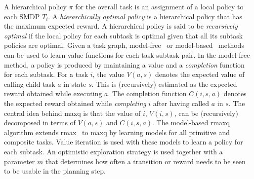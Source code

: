   A hierarchical policy $\pi$ for the
overall task is an assignment of a local policy to each SMDP $T_i$.  A
\textit{hierarchically optimal policy} is a 
hierarchical policy that has the maximum expected reward.  A
hierarchical policy is said to be \textit{recursively optimal} if the
local policy for each subtask is optimal given that all its subtask
policies are optimal.  
Given a task graph,
model-free~\cite{d-hrl-00} or model-based~\cite{rmax-maxq} methods can
be used to learn value functions for each task-subtask pair.
In the model-free method, a policy is produced by maintaining a value
and a {\em completion} function for each subtask. For a task $i$, the
value $V(a,s)$ denotes the expected value of calling child task $a$ in
state $s$. This is (recursively) estimated as the expected reward
obtained while executing $a$. The completion function $C(i,s,a)$
denotes the expected reward obtained while {\em completing} $i$ after
having called $a$ in $s$. The central idea behind {\sc maxq} is that
the value of $i$, $V(i,s)$, can be (recursively) decomposed in terms
of $V(a,s)$ and $C(i,s,a)$. The model-based {\sc
rmaxq}~\cite{rmax-maxq} algorithm extends {\sc
rmax}~\cite{Brafman01r-max} to {\sc maxq} by learning models for all
primitive and composite tasks. Value iteration is used with these
models to learn a policy for each subtask. An optimistic exploration
strategy is used together with a parameter $m$ that
determines how often a transition or reward needs to be seen to be
usable in the planning step.

